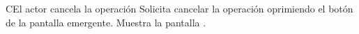  \begin{UCtrayectoriaA}{C}{El actor cancela la operación}
    \UCpaso[\UCactor] Solicita cancelar la operación oprimiendo el botón  de la pantalla emergente.
    \UCpaso[\UCsist] Muestra la pantalla .
 \end{UCtrayectoriaA}
 
